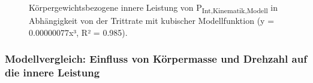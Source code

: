 \documentclass[
  letterpaper,
  DIV=11]{scrartcl}
\begin{document}
\begin{figure}


\caption{\label{fig-PInt_Kin_Mod}Körpergewichtsbezogene innere Leistung
von P\textsubscript{Int,Kinematik,Modell} in Abhängigkeit von der
Trittrate mit kubischer Modellfunktion (y = 0.00000077x³, R² = 0.985).}

\end{figure}%

\subsubsection{Modellvergleich: Einfluss von Körpermasse und Drehzahl
auf die innere
Leistung}\label{modellvergleich-einfluss-von-kuxf6rpermasse-und-drehzahl-auf-die-innere-leistung}
\end{document}
